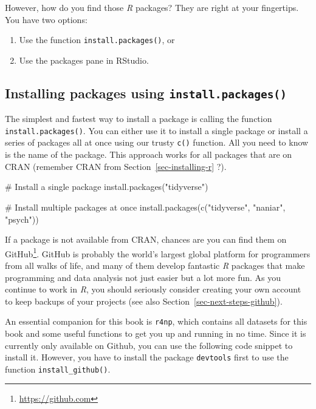 \documentclass[
  letterpaper,
]{krantz}
\makeatletter
\newenvironment{Shaded}{\begin{snugshade}}{\end{snugshade}}
\newcommand{\CommentTok}[1]{\textcolor[rgb]{0.37,0.37,0.37}{#1}}
\newcommand{\FunctionTok}[1]{\textcolor[rgb]{0.28,0.35,0.67}{#1}}
\newcommand{\NormalTok}[1]{\textcolor[rgb]{0.00,0.23,0.31}{#1}}
\newcommand{\StringTok}[1]{\textcolor[rgb]{0.13,0.47,0.30}{#1}}
\renewcommand{\href}[2]{#2\footnote{\url{#1}}}
\newenvironment{kframe}{%
\medskip{}
\setlength{\fboxsep}{.8em}
 \def\at@end@of@kframe{}%
 \ifinner\ifhmode%
  \def\at@end@of@kframe{\end{minipage}}%
  \begin{minipage}{\columnwidth}%
 \fi\fi%
 \def\FrameCommand##1{\hskip\@totalleftmargin \hskip-\fboxsep
 \colorbox{shadecolor}{##1}\hskip-\fboxsep
     \hskip-\linewidth \hskip-\@totalleftmargin \hskip\columnwidth}%
 \MakeFramed {\advance\hsize-\width
   \@totalleftmargin\z@ \linewidth\hsize
   \@setminipage}}%
 {\par\unskip\endMakeFramed%
 \at@end@of@kframe}
\renewenvironment{Shaded}{\begin{kframe}}{\end{kframe}}
\makeatother
\begin{document}
However, how do you find those \emph{R} packages? They are right at your
fingertips. You have two options:

\begin{enumerate}
\def\labelenumi{\arabic{enumi}.}
\item
  Use the function \texttt{install.packages()}, or
\item
  Use the packages pane in RStudio.
\end{enumerate}

\subsection{\texorpdfstring{Installing packages using
\texttt{install.packages()}}{Installing packages using install.packages()}}\label{sec-installing-packages-using-a-function}

The simplest and fastest way to install a package is calling the
function \texttt{install.packages()}. You can either use it to install a
single package or install a series of packages all at once using our
trusty \texttt{c()} function. All you need to know is the name of the
package. This approach works for all packages that are on CRAN (remember
CRAN from Section~\ref{sec-installing-r} ?).

\begin{Shaded}
\begin{Highlighting}[]
\CommentTok{\# Install a single package}
\FunctionTok{install.packages}\NormalTok{(}\StringTok{"tidyverse"}\NormalTok{)}

\CommentTok{\# Install multiple packages at once}
\FunctionTok{install.packages}\NormalTok{(}\FunctionTok{c}\NormalTok{(}\StringTok{"tidyverse"}\NormalTok{, }\StringTok{"naniar"}\NormalTok{, }\StringTok{"psych"}\NormalTok{))}
\end{Highlighting}
\end{Shaded}

If a package is not available from CRAN, chances are you can find them
on \href{https://github.com}{GitHub}. GitHub is probably the world's
largest global platform for programmers from all walks of life, and many
of them develop fantastic \emph{R} packages that make programming and
data analysis not just easier but a lot more fun. As you continue to
work in \emph{R}, you should seriously consider creating your own
account to keep backups of your projects (see also
Section~\ref{sec-next-steps-github}).

An essential companion for this book is \texttt{r4np}, which contains
all datasets for this book and some useful functions to get you up and
running in no time. Since it is currently only available on Github, you
can use the following code snippet to install it. However, you have to
install the package \texttt{devtools} first to use the function
\texttt{install\_github()}.
\end{document}

